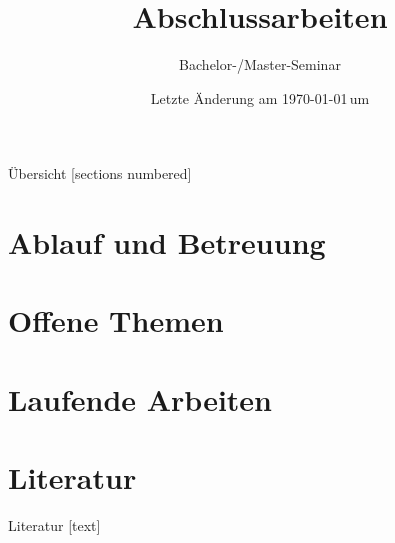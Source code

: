 \documentclass[aspectratio=169]{beamer}
\title[Abschlussarbeiten]{Abschlussarbeiten}
\subtitle[]{Bachelor-/Master-Seminar}
\author{}
\institute{}
\date{
	{\vfill \tiny Letzte Änderung am \today\,um \currenttime}
}
\begin{document}
\frame{
	\maketitle
}


\begin{frame}{Übersicht}
  [sections numbered]
  \tableofcontents%
\end{frame}

\section{Ablauf und Betreuung}


\section{Offene Themen}


\section{Laufende Arbeiten}


\section{Literatur}
\begin{frame}[allowframebreaks]{Literatur}
	[text]
	
		
\end{frame}
\end{document}
